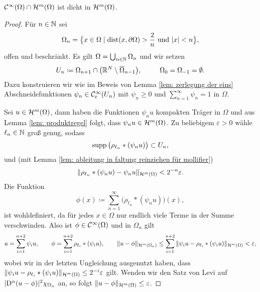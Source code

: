 \begin{thm}\label{thm: meyers and serrin}
	\(\mathcal{C}^\infty(\Omega)\cap\mathcal{H}^m(\Omega)\) ist dicht in \(\mathcal{H}^m(\Omega)\).
\end{thm}
\begin{proof}
	\vspace{2cm}
	
	Für \(n\in\mathbb{N}\) sei 
	\begin{equation*}
		\Omega_n=\big\{x\in\Omega\mid\operatorname{dist}(x,\partial\Omega)>\frac{2}{n}\text{ und }|x|<n\big\},
	\end{equation*}
	offen und beschränkt. Es gilt \(\Omega=\bigcup_{n\in\mathbb{N}}\Omega_n\) und wir setzen
	\begin{equation*}
		U_n\coloneqq\Omega_{n+1}\cap\big(\mathbb{R}^N\setminus\overline{\Omega}_{n-1}\big),\;\;\qquad\Omega_0=\Omega_{-1}=\emptyset.
	\end{equation*}
	Dazu konstruieren wir wie im Beweis von Lemma \ref{lem: zerlegung der eins} Abschneidefunktionen \(\psi_n\in\mathcal{C}_{\mathrm{c}}^\infty(U_n)\) mit \(\psi_n\geq0\) und \(\sum_{n=1}^\infty\psi_n=1\) in \(\Omega\).
	
	Sei \(u\in\mathcal{H}^m(\Omega)\), dann haben die Funktionen \(\psi_nu\) kompakten Träger in \(\Omega\) und aus Lemma \ref{lem: produktregel} folgt, dass \(\psi_nu\in\mathcal{H}^m(\Omega)\). Zu beliebigem \(\varepsilon>0\) wähle \(\ell_n\in\mathbb{N}\) groß genug, sodass
	\begin{equation*}
		\operatorname{supp}\big(\rho_{\ell_n}\ast(\psi_nu)\big)\subset U_n,
	\end{equation*}
	und (mit Lemma \ref{lem: ableitung in faltung reinziehen für mollifier})
	\begin{equation*}
		\|\rho_{\ell_n}\ast(\psi_nu)-\psi_nu\|_{\mathcal{H}^m(\Omega)}<2^{-n}\varepsilon.
	\end{equation*}
	Die Funktion
	\begin{equation*}
		\phi(x)\coloneqq\sum_{n=1}^\infty\big(\rho_{\ell_n}\ast(\psi_nu)\big)(x),
	\end{equation*}
	ist wohldefiniert, da für jedes \(x\in\Omega\) nur endlich viele Terme in der Summe  verschwinden. Also ist \(\phi\in\mathcal{C}^\infty(\Omega)\) und in \(\Omega_n\) gilt
	\begin{equation*}
		u=\sum_{i=1}^{n+2}\psi_iu,\qquad\phi=\sum_{i=1}^{n+2}\rho_{\ell_i}\ast(\psi_iu),\qquad\|u-\phi\|_{\mathcal{H}^m(\Omega_n)}\leq\sum_{i=1}^{n+2}\|\psi_iu-\rho_{\ell_i}\ast(\psi_iu)\|_{\mathcal{H}^m(\Omega)}<\varepsilon,
	\end{equation*}
	wobei wir in der letzten Ungleichung ausgenutzt haben, dass \(\|\psi_iu-\rho_{\ell_i}\ast(\psi_iu)\|_{\mathcal{H}^m(\Omega)}\leq2^{-i}\varepsilon\) gilt. Wenden wir den Satz von Levi auf \(|\mathrm{D}^\alpha(u-\phi)|^2\chi_{\Omega_n}\) an, so folgt \(\|u-\phi\|_{\mathcal{H}^m(\Omega)}\leq\varepsilon\).
\end{proof}
